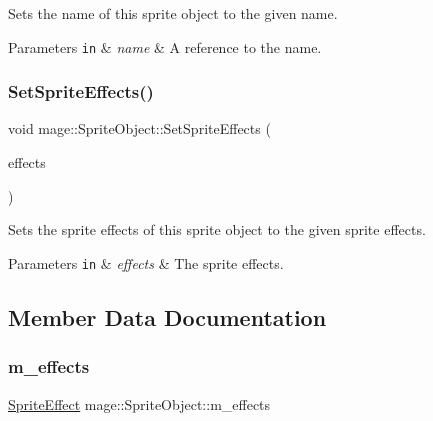 Sets the name of this sprite object to the given name.


\begin{DoxyParams}[1]{Parameters}
\mbox{\tt in}  & {\em name} & A reference to the name. \\
\hline
\end{DoxyParams}
\hypertarget{classmage_1_1_sprite_object_ad2eb556b5965d894e81cca96c5c0540b}{}\label{classmage_1_1_sprite_object_ad2eb556b5965d894e81cca96c5c0540b} 
\subsubsection{\texorpdfstring{Set\+Sprite\+Effects()}{SetSpriteEffects()}}
{\footnotesize\ttfamily void mage\+::\+Sprite\+Object\+::\+Set\+Sprite\+Effects (\begin{DoxyParamCaption}\item[{\hyperlink{namespacemage_a9cfe18123066ba4236f548f9de75d881}{Sprite\+Effect}}]{effects }\end{DoxyParamCaption})}

Sets the sprite effects of this sprite object to the given sprite effects.


\begin{DoxyParams}[1]{Parameters}
\mbox{\tt in}  & {\em effects} & The sprite effects. \\
\hline
\end{DoxyParams}


\subsection{Member Data Documentation}
\hypertarget{classmage_1_1_sprite_object_a270f73b8d316f72c4228854d08a6d2ea}{}\label{classmage_1_1_sprite_object_a270f73b8d316f72c4228854d08a6d2ea} 
\subsubsection{\texorpdfstring{m\+\_\+effects}{m\_effects}}
{\footnotesize\ttfamily \hyperlink{namespacemage_a9cfe18123066ba4236f548f9de75d881}{Sprite\+Effect} mage\+::\+Sprite\+Object\+::m\+\_\+effects\hspace{0.3cm}{\ttfamily [private]}}

